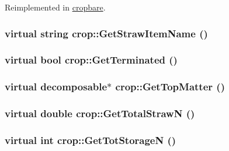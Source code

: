 Reimplemented in \hyperlink{classcropbare_a776fa8bf716f23af17ff9c1bb10d1bdc}{cropbare}.\hypertarget{classcrop_ad469acc2d28e07fc7356793c8cf7eabb}{
\subsubsection[{GetStrawItemName}]{\setlength{\rightskip}{0pt plus 5cm}virtual string crop::GetStrawItemName ()}}
\label{classcrop_ad469acc2d28e07fc7356793c8cf7eabb}
\hypertarget{classcrop_ae111caaea1504db0b2956e662defdc19}{
\subsubsection[{GetTerminated}]{\setlength{\rightskip}{0pt plus 5cm}virtual bool crop::GetTerminated ()}}
\label{classcrop_ae111caaea1504db0b2956e662defdc19}
\hypertarget{classcrop_aab72365c4fb148684a99ce2bcb9e0d70}{
\subsubsection[{GetTopMatter}]{\setlength{\rightskip}{0pt plus 5cm}virtual {\bf decomposable}$\ast$ crop::GetTopMatter ()}}
\label{classcrop_aab72365c4fb148684a99ce2bcb9e0d70}
\hypertarget{classcrop_aad20ce4175c73ff9e9e41cdde0ff6070}{
\subsubsection[{GetTotalStrawN}]{\setlength{\rightskip}{0pt plus 5cm}virtual double crop::GetTotalStrawN ()}}
\label{classcrop_aad20ce4175c73ff9e9e41cdde0ff6070}
\hypertarget{classcrop_a9e1e91e9a97bcd8d0867427ec54334d4}{
\subsubsection[{GetTotStorageN}]{\setlength{\rightskip}{0pt plus 5cm}virtual int crop::GetTotStorageN ()}}
